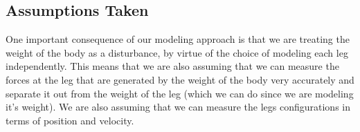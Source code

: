 \subsection{Assumptions Taken}
One important consequence of our modeling approach is that we are treating the weight of the body as a disturbance, by virtue of the choice of modeling each leg independently. This means that we are also assuming that we can measure the forces at the leg that are generated by the weight of the body very accurately and separate it out from the weight of the leg (which we can do since we are modeling it's weight).
We are also assuming that we can measure the legs configurations in terms of position and velocity.


